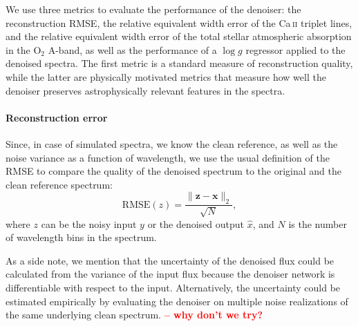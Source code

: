 \documentclass[twocolumn]{aastex7}
\newcommand{\ld}[1]{\textcolor{red}{\textbf{#1}}}
\newcommand{\m}[1]{\boldsymbol{#1}}
\begin{document}
We use three metrics to evaluate the performance of the denoiser: the reconstruction RMSE, the relative equivalent width error of the Ca\,\textsc{ii} triplet lines, and the relative equivalent width error of the total stellar atmospheric absorption in the \mbox{O$_2$} A-band, as well as the performance of a $\log g$ regressor applied to the denoised spectra. The first metric is a standard measure of reconstruction quality, while the latter are physically motivated metrics that measure how well the denoiser preserves astrophysically relevant features in the spectra.

\paragraph{Reconstruction error}
Since, in case of simulated spectra, we know the clean reference, as well as the noise variance as a function of wavelength, we use the usual definition of the RMSE to compare the quality of the denoised spectrum to the original and the clean reference spectrum:
\begin{equation}
    \mathrm{RMSE}(z)
    =
    \frac{\lVert \m{z} - \m{x} \rVert_{2}}{\sqrt{N}},
    \label{eq:rmse_def}
\end{equation}
where $z$ can be the noisy input $y$ or the denoised output $\hat{x}$, and $N$ is the number of wavelength bins in the spectrum.

As a side note, we mention that the uncertainty of the denoised flux could be calculated from the variance of the input flux because the denoiser network is differentiable with respect to the input. Alternatively, the uncertainty could be estimated empirically by evaluating the denoiser on multiple noise realizations of the same underlying clean spectrum. \ld{-- why don't we try?}
\end{document}
